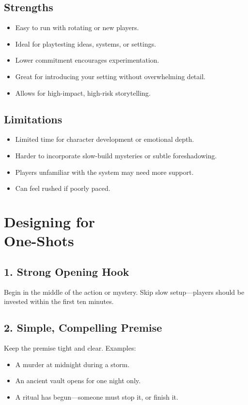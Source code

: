\subsection*{Strengths}
\begin{itemize}
    \item Easy to run with rotating or new players.
    \item Ideal for playtesting ideas, systems, or settings.
    \item Lower commitment encourages experimentation.
    \item Great for introducing your setting without overwhelming detail.
    \item Allows for high-impact, high-risk storytelling.
\end{itemize}

\subsection*{Limitations}
\begin{itemize}
    \item Limited time for character development or emotional depth.
    \item Harder to incorporate slow-build mysteries or subtle foreshadowing.
    \item Players unfamiliar with the system may need more support.
    \item Can feel rushed if poorly paced.
\end{itemize}

\section[Designing for One-Shots]{Designing for\\ One-Shots}

\subsection*{1. Strong Opening Hook}
Begin in the middle of the action or mystery. Skip slow setup—players should be invested within the first ten minutes.

\subsection*{2. Simple, Compelling Premise}
Keep the premise tight and clear. Examples:
\begin{itemize}
    \item A murder at midnight during a storm.
    \item An ancient vault opens for one night only.
    \item A ritual has begun—someone must stop it, or finish it.
\end{itemize}

